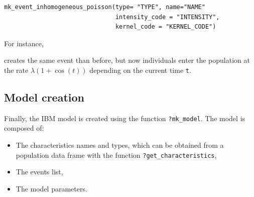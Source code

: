 \begin{verbatim}
mk_event_inhomogeneous_poisson(type= "TYPE", name="NAME"
                               intensity_code = "INTENSITY",
                               kernel_code = "KERNEL_CODE")
\end{verbatim}

For instance,

\begin{Shaded}
\begin{Highlighting}[]
\NormalTok{(} \NormalTok{,}
                                \NormalTok{,}
                                
\NormalTok{)}
\end{Highlighting}
\end{Shaded}

creates the same event than before, but now individuals enter the population at the rate \(\lambda(1+ \cos(t))\) depending on the current time \texttt{t}.

\hypertarget{Modelcreation}{%
\subsection{Model creation}\label{Modelcreation}}

Finally, the IBM model is created using the function \texttt{?mk\_model}. The model is composed of:

\begin{itemize}
\tightlist
\item
  The characteristics names and types, which can be obtained from a population data frame with the function \texttt{?get\_characteristics},
\item
  The events list,
\item
  The model parameters.
\end{itemize}

\begin{Shaded}
\begin{Highlighting}[]
\OtherTok{\textless{}{-}} \NormalTok{(} 
\end{Highlighting}
\end{Shaded}

